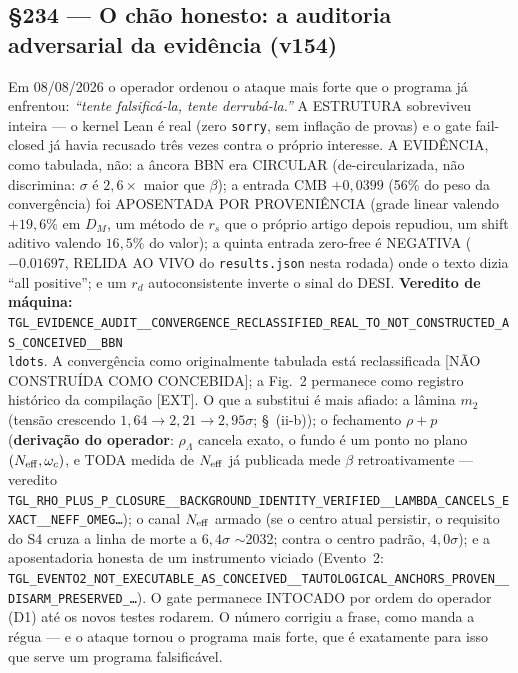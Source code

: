 \documentclass[11pt]{article}
\theoremstyle{definition}\newtheorem{deriv}{Derivação}
\begin{document}
\subsection*{\S234 --- O chão honesto: a auditoria adversarial da evidência (v154)}Em 08/08/2026 o operador ordenou o ataque mais forte que o programa já enfrentou: \emph{``tente falsificá-la, tente derrubá-la.''} A ESTRUTURA sobreviveu inteira --- o kernel Lean é real (zero \texttt{sorry}, sem inflação de provas) e o gate fail-closed já havia recusado três vezes contra o próprio interesse. A EVIDÊNCIA, como tabulada, não: a âncora BBN era CIRCULAR (de-circularizada, não discrimina: $\sigma$ é $2{,}6\times$ maior que $\beta$); a entrada CMB $+0{,}0399$ (56\% do peso da convergência) foi APOSENTADA POR PROVENIÊNCIA (grade linear valendo $+19{,}6\%$ em $D_M$, um método de $r_s$ que o próprio artigo depois repudiou, um shift aditivo valendo $16{,}5\%$ do valor); a quinta entrada zero-free é NEGATIVA ($-0.01697$, RELIDA AO VIVO do \texttt{results.json} nesta rodada) onde o texto dizia ``all positive''; e um $r_d$ autoconsistente inverte o sinal do DESI. \textbf{Veredito de máquina:} \texttt{TGL\_EVIDENCE\_AUDIT\_\_CONVERGENCE\_RECLASSIFIED\_REAL\_TO\_NOT\_CONSTRUCTED\_AS\_CONCEIVED\_\_BBN\\ldots}. A convergência como originalmente tabulada está reclassificada [NÃO CONSTRUÍDA COMO CONCEBIDA]; a Fig.~2 permanece como registro histórico da compilação [EXT]. O que a substitui é mais afiado: a lâmina $m_2$ (tensão crescendo $1{,}64\to2{,}21\to2{,}95\sigma$; \S~(ii-b)); o fechamento $\rho{+}p$ (\textbf{derivação do operador}: $\rho_\Lambda$ cancela exato, o fundo é um ponto no plano $(N_{\rm eff},\omega_c)$, e TODA medida de $N_{\rm eff}$ já publicada mede $\beta$ retroativamente --- veredito \texttt{TGL\_RHO\_PLUS\_P\_CLOSURE\_\_BACKGROUND\_IDENTITY\_VERIFIED\_\_LAMBDA\_CANCELS\_EXACT\_\_NEFF\_OMEG\ldots}); o canal $N_{\rm eff}$ armado (se o centro atual persistir, o requisito do S4 cruza a linha de morte a $6{,}4\sigma$ $\sim$2032; contra o centro padrão, $4{,}0\sigma$); e a aposentadoria honesta de um instrumento viciado (Evento~2: \texttt{TGL\_EVENTO2\_NOT\_EXECUTABLE\_AS\_CONCEIVED\_\_TAUTOLOGICAL\_ANCHORS\_PROVEN\_\_DISARM\_PRESERVED\_\ldots}). O gate permanece INTOCADO por ordem do operador (D1) até os novos testes rodarem. O número corrigiu a frase, como manda a régua --- e o ataque tornou o programa mais forte, que é exatamente para isso que serve um programa falsificável.
\end{document}
